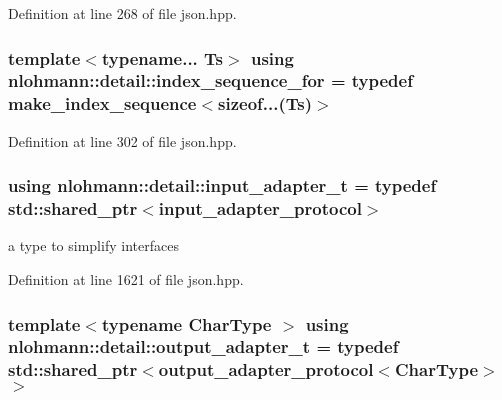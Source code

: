Definition at line 268 of file json.\+hpp.

\subsubsection[{\texorpdfstring{index\+\_\+sequence\+\_\+for}{index_sequence_for}}]{\setlength{\rightskip}{0pt plus 5cm}template$<$typename... Ts$>$ using {\bf nlohmann\+::detail\+::index\+\_\+sequence\+\_\+for} = typedef {\bf make\+\_\+index\+\_\+sequence}$<$sizeof...(Ts)$>$}\hypertarget{namespacenlohmann_1_1detail_a24800493c6ec02ce033dcbb47b7fd28e}{}\label{namespacenlohmann_1_1detail_a24800493c6ec02ce033dcbb47b7fd28e}


Definition at line 302 of file json.\+hpp.

\subsubsection[{\texorpdfstring{input\+\_\+adapter\+\_\+t}{input_adapter_t}}]{\setlength{\rightskip}{0pt plus 5cm}using {\bf nlohmann\+::detail\+::input\+\_\+adapter\+\_\+t} = typedef std\+::shared\+\_\+ptr$<${\bf input\+\_\+adapter\+\_\+protocol}$>$}\hypertarget{namespacenlohmann_1_1detail_ae132f8cd5bb24c5e9b40ad0eafedf1c2}{}\label{namespacenlohmann_1_1detail_ae132f8cd5bb24c5e9b40ad0eafedf1c2}


a type to simplify interfaces 



Definition at line 1621 of file json.\+hpp.

\subsubsection[{\texorpdfstring{output\+\_\+adapter\+\_\+t}{output_adapter_t}}]{\setlength{\rightskip}{0pt plus 5cm}template$<$typename Char\+Type $>$ using {\bf nlohmann\+::detail\+::output\+\_\+adapter\+\_\+t} = typedef std\+::shared\+\_\+ptr$<${\bf output\+\_\+adapter\+\_\+protocol}$<$Char\+Type$>$$>$}\hypertarget{namespacenlohmann_1_1detail_a0fd8edff7729aa2dd92b070964bade2e}{}\label{namespacenlohmann_1_1detail_a0fd8edff7729aa2dd92b070964bade2e}


